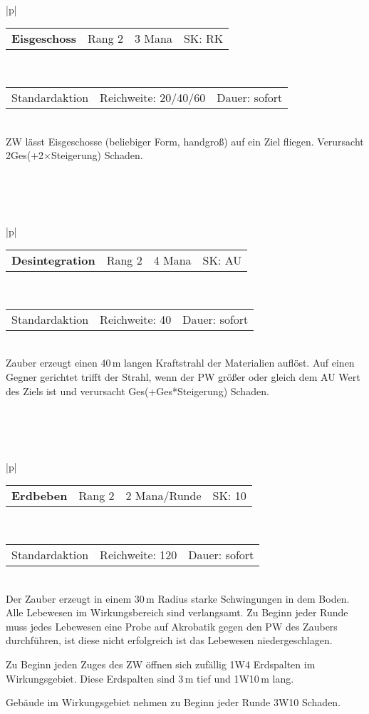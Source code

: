 \documentclass[../../Heldenanleitung2]{subfiles}
\begin{document}
\\\\\\
\begin{tabular}{|p{\textwidth}|}
\hline
\begin{tabularx}{\textwidth}{X|X|X|X}
\textbf{Eisgeschoss} & Rang 2 & 3 Mana & SK: RK
\end{tabularx} \\ \hline
\begin{tabularx}{\textwidth}{X|X|X}
Standardaktion & Reichweite: 20/40/60 & Dauer: sofort
\end{tabularx} \\ \hline
ZW lässt Eisgeschosse (beliebiger Form, handgroß) auf ein Ziel fliegen. Verursacht 2Ges(+2$\times$Steigerung) Schaden.
\\ \hline
\end{tabular}
\\\\\\
\begin{tabular}{|p{\textwidth}|}
\hline
\begin{tabularx}{\textwidth}{X|X|X|X}
\textbf{Desintegration} & Rang 2 & 4 Mana & SK: AU
\end{tabularx} \\ \hline
\begin{tabularx}{\textwidth}{X|X|X}
Standardaktion & Reichweite: 40 & Dauer: sofort
\end{tabularx} \\ \hline
Zauber erzeugt einen 40\,m langen Kraftstrahl der Materialien auflöst. Auf einen Gegner gerichtet trifft der Strahl, wenn der PW größer oder gleich dem AU Wert des Ziels ist und verursacht Ges(+Ges*Steigerung) Schaden.
\\ \hline
\end{tabular}
\\\\\\
\begin{tabular}{|p{\textwidth}|}
\hline
\begin{tabularx}{\textwidth}{X|X|X|X}
\textbf{Erdbeben} & Rang 2 & 2 Mana/Runde & SK: 10
\end{tabularx} \\ \hline
\begin{tabularx}{\textwidth}{X|X|X}
Standardaktion & Reichweite: 120 & Dauer: sofort
\end{tabularx} \\ \hline
Der Zauber erzeugt in einem 30\,m Radius starke Schwingungen in dem Boden. Alle Lebewesen im Wirkungsbereich sind verlangsamt. Zu Beginn jeder Runde muss jedes Lebewesen eine Probe auf Akrobatik gegen den PW des Zaubers durchführen, ist diese nicht erfolgreich ist das Lebewesen niedergeschlagen.

Zu Beginn jeden Zuges des ZW öffnen sich zufällig 1W4 Erdspalten im Wirkungsgebiet. Diese Erdspalten sind 3\,m tief und 1W10\,m lang.

Gebäude im Wirkungsgebiet nehmen zu Beginn jeder Runde 3W10 Schaden.
\\ \hline
\end{tabular}
\end{document}
